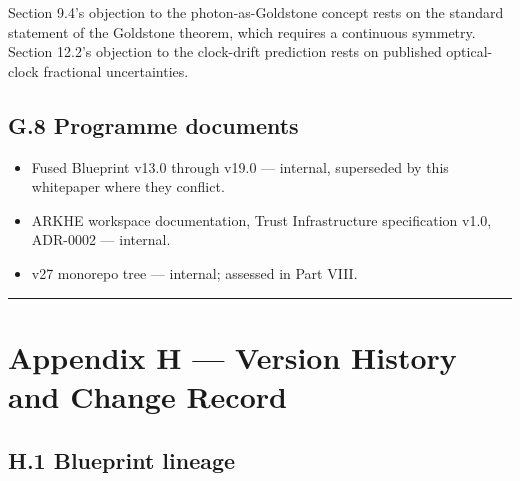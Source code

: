 \documentclass[
  11pt]{report}
\providecommand{\tightlist}{%
  \setlength{\itemsep}{0pt}\setlength{\parskip}{0pt}}
\begin{document}
Section 9.4's objection to the photon-as-Goldstone concept rests on the
standard statement of the Goldstone theorem, which requires a continuous
symmetry. Section 12.2's objection to the clock-drift prediction rests
on published optical-clock fractional uncertainties.

\hypertarget{g.8-programme-documents}{%
\section{G.8 Programme documents}\label{g.8-programme-documents}}

\begin{itemize}
\tightlist
\item
  Fused Blueprint v13.0 through v19.0 --- internal, superseded by this
  whitepaper where they conflict.
\item
  ARKHE workspace documentation, Trust Infrastructure specification
  v1.0, ADR-0002 --- internal.
\item
  v27 monorepo tree --- internal; assessed in Part VIII.
\end{itemize}

\begin{center}\rule{0.5\linewidth}{0.5pt}\end{center}

\hypertarget{appendix-h-version-history-and-change-record}{%
\chapter{Appendix H --- Version History and Change
Record}\label{appendix-h-version-history-and-change-record}}

\hypertarget{h.1-blueprint-lineage}{%
\section{H.1 Blueprint lineage}\label{h.1-blueprint-lineage}}
\end{document}

